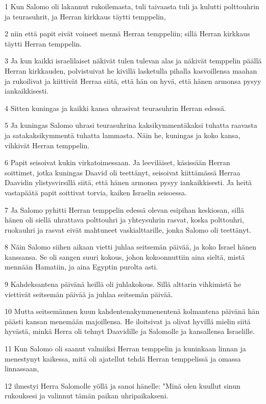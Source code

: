 \par 1 Kun Salomo oli lakannut rukoilemasta, tuli taivaasta tuli ja kulutti polttouhrin ja teurasuhrit, ja Herran kirkkaus täytti temppelin,
\par 2 niin että papit eivät voineet mennä Herran temppeliin; sillä Herran kirkkaus täytti Herran temppelin.
\par 3 Ja kun kaikki israelilaiset näkivät tulen tulevan alas ja näkivät temppelin päällä Herran kirkkauden, polvistuivat he kivillä lasketulla pihalla kasvoillensa maahan ja rukoilivat ja kiittivät Herraa siitä, että hän on hyvä, että hänen armonsa pysyy iankaikkisesti.
\par 4 Sitten kuningas ja kaikki kansa uhrasivat teurasuhrin Herran edessä.
\par 5 Ja kuningas Salomo uhrasi teurasuhrina kaksikymmentäkaksi tuhatta raavasta ja satakaksikymmentä tuhatta lammasta. Näin he, kuningas ja koko kansa, vihkivät Herran temppelin.
\par 6 Papit seisoivat kukin virkatoimessaan. Ja leeviläiset, käsissään Herran soittimet, jotka kuningas Daavid oli teettänyt, seisoivat kiittämässä Herraa Daavidin ylistysvirsillä siitä, että hänen armonsa pysyy iankaikkisesti. Ja heitä vastapäätä papit soittivat torvia, kaiken Israelin seisoessa.
\par 7 Ja Salomo pyhitti Herran temppelin edessä olevan esipihan keskiosan, sillä hänen oli siellä uhrattava polttouhri ja yhteysuhrin rasvat, koska polttouhri, ruokauhri ja rasvat eivät mahtuneet vaskialttarille, jonka Salomo oli teettänyt.
\par 8 Näin Salomo siihen aikaan vietti juhlaa seitsemän päivää, ja koko Israel hänen kanssansa. Se oli sangen suuri kokous, johon kokoonnuttiin aina sieltä, mistä mennään Hamatiin, ja aina Egyptin purolta asti.
\par 9 Kahdeksantena päivänä heillä oli juhlakokous. Sillä alttarin vihkimistä he viettivät seitsemän päivää ja juhlaa seitsemän päivää.
\par 10 Mutta seitsemännen kuun kahdentenakymmenentenä kolmantena päivänä hän päästi kansan menemään majoillensa. He iloitsivat ja olivat hyvillä mielin siitä hyvästä, minkä Herra oli tehnyt Daavidille ja Salomolle ja kansallensa Israelille.
\par 11 Kun Salomo oli saanut valmiiksi Herran temppelin ja kuninkaan linnan ja menestynyt kaikessa, mitä oli ajatellut tehdä Herran temppelissä ja omassa linnassaan,
\par 12 ilmestyi Herra Salomolle yöllä ja sanoi hänelle: "Minä olen kuullut sinun rukouksesi ja valinnut tämän paikan uhripaikakseni.
